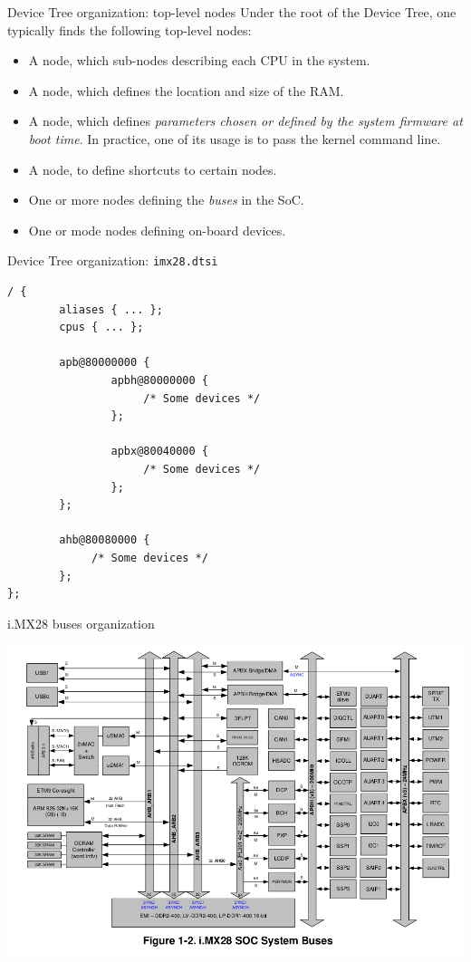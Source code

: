 \documentclass[obeyspaces,spaces,hyphens]{beamer}
\begin{document}
\begin{frame}{Device Tree organization: top-level nodes}
  Under the root of the Device Tree, one typically finds the following
  top-level nodes:
  \begin{itemize}
  \item A  node, which sub-nodes describing each CPU in the
    system.
  \item A  node, which defines the location and size of the RAM.
  \item A  node, which defines {\em parameters chosen or
      defined by the system firmware at boot time}. In practice, one
    of its usage is to pass the kernel command line.
  \item A  node, to define shortcuts to certain nodes.
  \item One or more nodes defining the {\em buses} in the SoC.
  \item One or mode nodes defining on-board devices.
  \end{itemize}
\end{frame}

\begin{frame}[fragile]{Device Tree organization: {\tt imx28.dtsi}}
  \begin{block}{}
  \begin{verbatim}
/ {
        aliases { ... };
        cpus { ... };

        apb@80000000 {
                apbh@80000000 {
                     /* Some devices */
                };

                apbx@80040000 {
                     /* Some devices */
                };
        };

        ahb@80080000 {
             /* Some devices */
        };
};
\end{verbatim}
\end{block}
\end{frame}

\begin{frame}{i.MX28 buses organization}
  \begin{center}
    \includegraphics[width=\textwidth]{imx28-busses.png}
  \end{center}
\end{frame}
\end{document}
